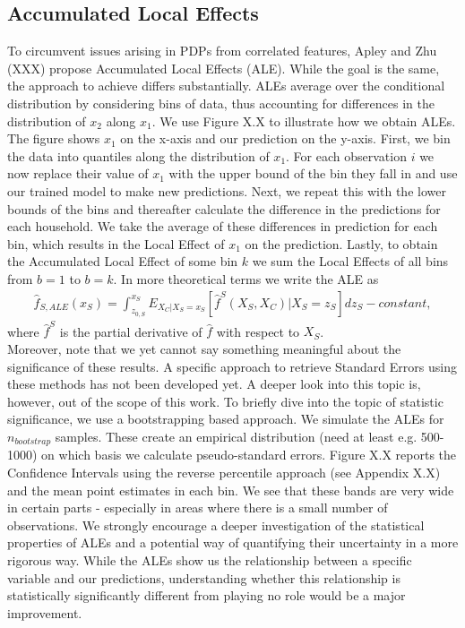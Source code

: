 \subsection{Accumulated Local Effects}
To circumvent issues arising in PDPs from correlated features, Apley and Zhu (XXX) propose Accumulated Local Effects (ALE). While the goal is the same, the approach to achieve differs substantially. ALEs average over the conditional distribution by considering bins of data, thus accounting for differences in the distribution of $x_2$ along $x_1$. We use Figure X.X to illustrate how we obtain ALEs. The figure shows $x_1$ on the x-axis and our prediction on the y-axis. First, we bin the data into quantiles along the distribution of $x_1$. For each observation $i$ we now replace their value of $x_1$ with the upper bound of the bin they fall in and use our trained model to make new predictions. Next, we repeat this with the lower bounds of the bins and thereafter calculate the difference in the predictions for each household. We take the average of these differences in prediction for each bin, which results in the Local Effect of $x_1$  on the prediction. Lastly, to obtain the Accumulated Local Effect of some bin $k$ we sum the Local Effects of all bins from $b=1$ to $b=k$. In more theoretical terms we write the ALE as 
\begin{align}
    \hat{f}_{S, ALE} (x_S)=\int_{z_{0, S}}^{x_S} E_{X_C|X_S=x_S}[\hat{f}^S(X_S, X_C)|X_S=z_S]dz_S - constant, \label{eq: ALE}
\end{align}
where $\hat{f}^S$ is the partial derivative of $\hat{f}$ with respect to $X_S$. \\ 
Moreover, note that we yet cannot say something meaningful about the significance of these results. A specific approach to retrieve Standard Errors using these methods has not been developed yet. A deeper look into this topic is, however, out of the scope of this work. To briefly dive into the topic of statistic significance, we use a bootstrapping based approach. We simulate the ALEs for $n_{bootstrap}$ samples. These create an empirical distribution (need at least e.g. 500-1000) on which basis we calculate pseudo-standard errors. Figure X.X reports the Confidence Intervals using the reverse percentile approach (see Appendix X.X) and the mean point estimates in each bin. We see that these bands are very wide in certain parts - especially in areas where there is a small number of observations. We strongly encourage a deeper investigation of the statistical properties of ALEs and a potential way of quantifying their uncertainty in a more rigorous way. While the ALEs show us the relationship between a specific variable and our predictions, understanding whether this relationship is statistically significantly different from playing no role would be a major improvement. 